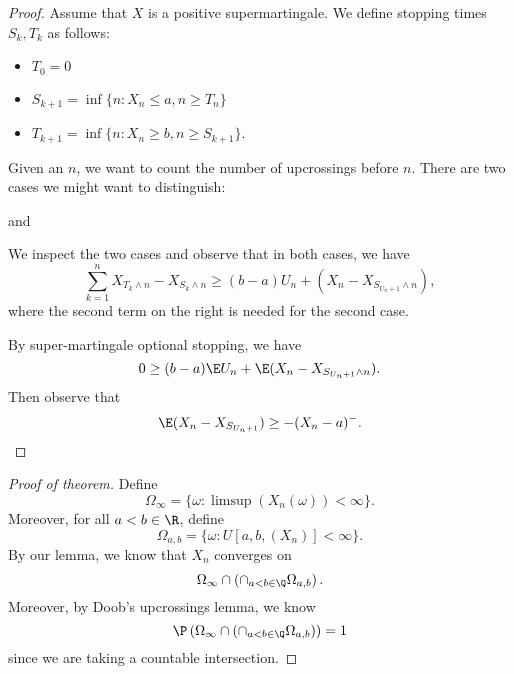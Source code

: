\documentclass[a4paper]{article}
\begin{document}
\begin{proof}

  Assume that $X$ is a positive supermartingale. We define stopping times $S_k, T_k$ as follows:
  \begin{itemize}
    \item $T_0 = 0$
    \item $S_{k + 1} = \inf\{n: X_n \leq a, n \geq T_n\}$
    \item $T_{k + 1} = \inf\{n: X_n \geq b, n \geq S_{k + 1}\}$.
  \end{itemize}
  Given an $n$, we want to count the number of upcrossings before $n$. There are two cases we might want to distinguish:
  \begin{center}
    \quad
    and
    \quad
  \end{center}
  We inspect the two cases and observe that in both cases, we have
  \[
    \sum_{k = 1}^n X_{T_k \wedge n} - X_{S_k \wedge n} \geq (b - a) U_n + (X_n - X_{S_{U_n + 1} \wedge n}),
  \]
  where the second term on the right is needed for the second case.

  By super-martingale optional stopping, we have
  \[
    0 \geq (b - a) \E U_n + \E(X_n - X_{S_{U_n + 1} \wedge n}).
  \]
  Then observe that
  \[
    \E(X_n- X_{S_{U_n + 1}}) \geq - (X_n - a)^-.
  \]
\end{proof}

\begin{proof}[Proof of theorem]
  Define
  \[
    \Omega_\infty = \{\omega: \limsup (X_n(\omega))< \infty\}.
  \]
  Moreover, for all $a < b \in \R$, define
  \[
    \Omega_{a, b} = \{\omega: U[a, b, (X_n)] < \infty\}.
  \]
  By our lemma, we know that $X_n$ converges on
  \[
    \Omega_\infty \cap \left(\cap_{a < b \in \Q} \Omega_{a, b}\right).
  \]
  Moreover, by Doob's upcrossings lemma, we know
  \[
    \P\left(\Omega_\infty \cap \left(\cap_{a < b \in \Q} \Omega_{a, b}\right)\right) = 1
  \]
  since we are taking a countable intersection.
\end{proof}
\end{document}
